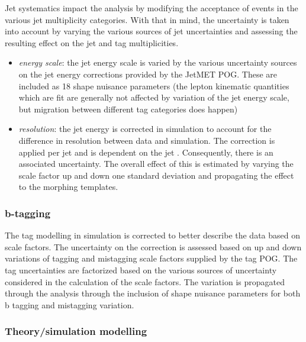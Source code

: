     Jet systematics impact the analysis by modifying the acceptance of
    events in the various jet multiplicity categories.  With that in
    mind, the uncertainty is taken into account by varying the various
    sources of jet uncertainties and assessing the resulting effect on
    the jet and \PQb tag multiplicities.

    \begin{itemize}
        \item \textit{energy scale}: the jet energy scale is varied by
            the various uncertainty sources on the jet energy
            corrections provided by the JetMET POG.  These are included
            as 18 shape nuisance parameters (the lepton kinematic quantities
            which are fit are generally not affected by variation of the
            jet energy scale, but migration between different \PQb tag
            categories does happen)
        \item \textit{resolution}: the jet energy is corrected in
            simulation to account for the difference in resolution
            between data and simulation.  The correction is applied per
            jet and is dependent on the jet \pt.  Consequently, there is
            an associated uncertainty.  The overall effect of this is
            estimated by varying the scale factor up and down one
            standard deviation and propagating the effect to the
            morphing templates.
    \end{itemize}

\subsubsection{b-tagging}
    
The \PQb tag modelling in simulation is corrected to better describe the
data based on scale factors.  The uncertainty on the correction is
assessed based on up and down variations of \PQb tagging and mistagging
scale factors supplied by the \PQb tag POG.  The \PQb tag uncertainties are
factorized based on the various sources of uncertainty considered in the
calculation of the scale factors.  The variation is propagated through
the analysis through the inclusion of shape nuisance parameters for both
b tagging and mistagging variation.




\subsubsection{Theory/simulation modelling}

